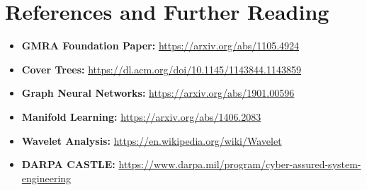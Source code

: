 \documentclass[12pt]{article}
\begin{document}
\section{References and Further Reading}

\begin{itemize}
    \item \textbf{GMRA Foundation Paper:} \url{https://arxiv.org/abs/1105.4924}
    \item \textbf{Cover Trees:} \url{https://dl.acm.org/doi/10.1145/1143844.1143859}
    \item \textbf{Graph Neural Networks:} \url{https://arxiv.org/abs/1901.00596}
    \item \textbf{Manifold Learning:} \url{https://arxiv.org/abs/1406.2083}
    \item \textbf{Wavelet Analysis:} \url{https://en.wikipedia.org/wiki/Wavelet}
    \item \textbf{DARPA CASTLE:} \url{https://www.darpa.mil/program/cyber-assured-system-engineering}
\end{itemize}
\end{document}
